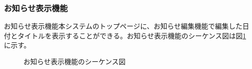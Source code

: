 \documentclass[a4j]{jarticle}
\begin{document}
 \subsubsection{お知らせ表示機能}
 お知らせ表示機能本システムのトップページに、お知らせ編集機能で編集した日付とタイトルを表示することができる。お知らせ表示機能のシーケンス図は図\ref{fig:admin_news_display.png}に示す。
             \begin{figure}[H]
\centering
{}
\caption{お知らせ表示機能のシーケンス図}
\label{fig:admin_news_display.png}
\end{figure}
\end{document}
